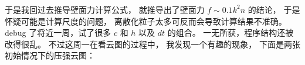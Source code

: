 \begin{frame}
    \frametitle{\subsecname}
    于是我回过去推导壁面力计算公式，
    就推导出了壁面力 $f\sim 0.1k^2 n$ 的结论，
    于是怀疑可能是计算尺度的问题，
    离散化粒子太多可反而会导致计算结果不准确。
    debug 了将近一周，试了很多 $c$ 和 $h$ 以及 $dt$ 的组合。
    一无所获，程序结构还被改得很乱。
    不过这周一在看云图的过程中，
    我发现一个有趣的现象，
    下面是两张初始情况下的压强云图：
    \begin{figure}[H]
        \centering
    \end{figure}
\end{frame}

